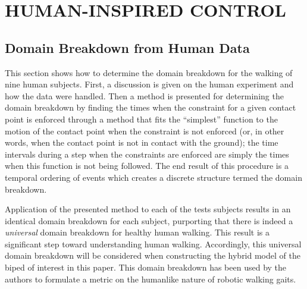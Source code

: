 \chapter{\uppercase{Human-Inspired Control}}

\section{Domain Breakdown from Human Data} \label{sec:domainbreakdown} \noindent
This section shows how to determine the domain breakdown for the walking of nine human subjects.  First, a discussion is given on the human experiment and how the data were handled. Then a method is presented for determining the domain breakdown by finding the times when the constraint for a given contact point is enforced through a method that fits the ``simplest'' function to the motion of the contact point when the constraint is not enforced (or, in other words, when the contact point is not in contact with the ground); the time intervals during a step when the constraints are enforced are simply the times when this function is not being followed. The end result of this procedure is a temporal ordering of events which creates a discrete structure termed the domain breakdown.

Application of the presented method to each of the tests subjects results in an identical domain breakdown for each subject, purporting that there is indeed a {\em universal} domain breakdown for healthy human walking. This result is a significant step toward understanding human walking. Accordingly, this universal domain breakdown will be considered when constructing the hybrid model of the biped of interest in this paper. This domain breakdown has been used by the authors to formulate a metric on the humanlike nature of robotic walking gaits.\cite{AVB11,VAB11}



